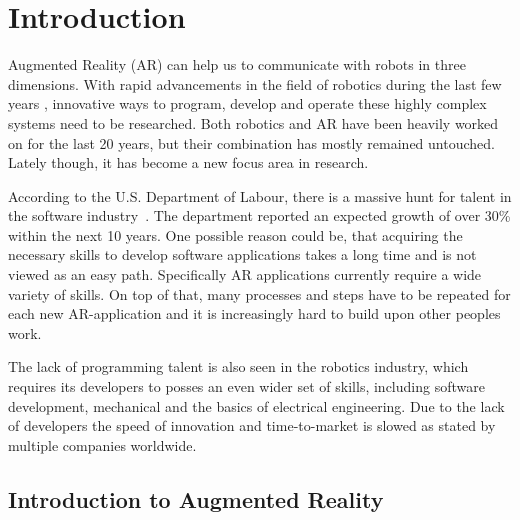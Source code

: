 \chapter{Introduction}\label{Chap:Introduction}

Augmented Reality (AR) can help us to communicate with robots in three dimensions. With rapid
advancements in the field of robotics during the last few years \cite{laschi2016soft}, innovative ways to program, develop and operate these highly complex systems need to be researched. Both robotics and AR have been heavily worked on for the last 20 years, but their combination has mostly remained untouched. Lately though, it has become a new focus area in research.

According to the U.S. Department of Labour, there is a massive hunt for talent in the software industry~\cite{blsGov}. The department reported an expected growth of over 30\% within the next 10 years. One possible reason could be, that acquiring the necessary skills to develop software applications takes a long time and is not viewed as an easy path. Specifically AR applications currently require a wide variety of skills. On top of that, many processes and steps have to be repeated for each new AR-application and it is increasingly hard to build upon other peoples work.

The lack of programming talent is also seen in the robotics industry, which requires its developers to posses an even wider set of skills, including software development, mechanical and the basics of electrical engineering. Due to the lack of developers the speed of innovation and time-to-market is slowed as stated by multiple companies worldwide.


\section{Introduction to Augmented Reality}



